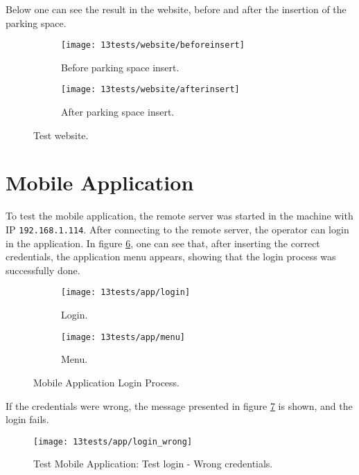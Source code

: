 Below one can see the result in the website, before and after the insertion of the parking space.

\begin{figure}[H]
	\centering
	\begin{subfigure}{.4\textwidth}
		\centering
		\texttt{[image: 13tests/website/beforeinsert]}
		\caption{Before parking space insert.}
		\label{fig:login}
	\end{subfigure}%
	\begin{subfigure}{.4\textwidth}
		\centering
		\texttt{[image: 13tests/website/afterinsert]}
		\caption{After parking space insert.}
		\label{fig:menu}
	\end{subfigure}
	\caption{Test website.}
	\label{fig:applogin}
\end{figure}

\clearpage
\section{Mobile Application}

To test the mobile application, the remote server was started in the machine with IP \verb|192.168.1.114|. After connecting to the remote server, the operator can login in the application. In figure \ref{fig:applogin}, one can see that, after inserting the correct credentials, the application menu appears, showing that the login process was successfully done.

\begin{figure}[H]
	\centering
	\begin{subfigure}{.4\textwidth}
		\centering
		\texttt{[image: 13tests/app/login]}
		\caption{Login.}
		\label{fig:login}
	\end{subfigure}%
	\begin{subfigure}{.4\textwidth}
		\centering
		\texttt{[image: 13tests/app/menu]}
		\caption{Menu.}
		\label{fig:menu}
	\end{subfigure}
	\caption{Mobile Application Login Process.}
	\label{fig:applogin}
\end{figure}

If the credentials were wrong, the message presented in figure \ref{fig:login_wrong} is shown, and the login fails.

\begin{figure}[H]
	\centering	
	\texttt{[image: 13tests/app/login\_wrong]}
	\caption{Test Mobile Application: Test login - Wrong credentials.}
	\label{fig:login_wrong}
\end{figure}
